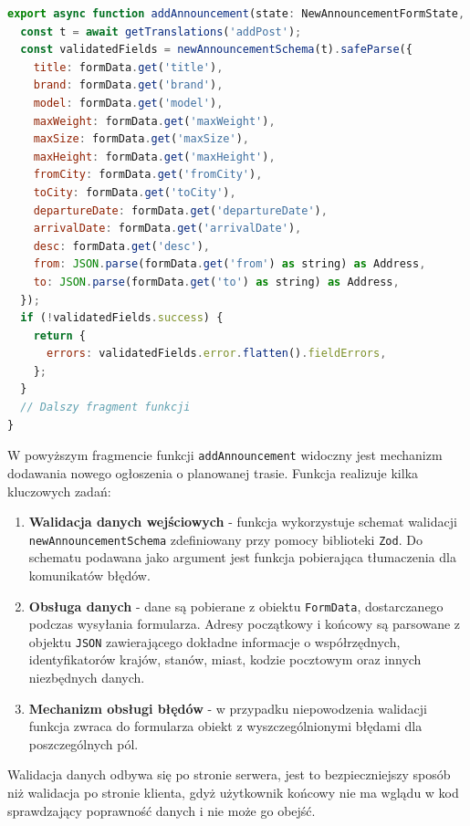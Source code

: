 {\belowcaptionskip=-9pt
\begin{lstlisting}[language=JavaScript,caption=Wstępna walidacja danych przed dodaniem ogłoszenia do bazy danych, label=lst:addAnnouncement]
export async function addAnnouncement(state: NewAnnouncementFormState, formData: FormData) {
  const t = await getTranslations('addPost');
  const validatedFields = newAnnouncementSchema(t).safeParse({
    title: formData.get('title'),
    brand: formData.get('brand'),
    model: formData.get('model'),
    maxWeight: formData.get('maxWeight'),
    maxSize: formData.get('maxSize'),
    maxHeight: formData.get('maxHeight'),
    fromCity: formData.get('fromCity'),
    toCity: formData.get('toCity'),
    departureDate: formData.get('departureDate'),
    arrivalDate: formData.get('arrivalDate'),
    desc: formData.get('desc'),
    from: JSON.parse(formData.get('from') as string) as Address,
    to: JSON.parse(formData.get('to') as string) as Address,
  });
  if (!validatedFields.success) {
    return {
      errors: validatedFields.error.flatten().fieldErrors,
    };
  }
  // Dalszy fragment funkcji
}
\end{lstlisting}
}

W powyższym fragmencie funkcji \texttt{addAnnouncement} widoczny jest mechanizm dodawania nowego ogłoszenia o planowanej trasie. Funkcja realizuje kilka kluczowych zadań:
\begin{enumerate}
    \item \textbf{Walidacja danych wejściowych} - funkcja wykorzystuje schemat walidacji \texttt{newAnnouncementSchema} zdefiniowany przy pomocy biblioteki \texttt{Zod}. Do schematu podawana jako argument jest funkcja pobierająca tłumaczenia dla komunikatów błędów.
    \item \textbf{Obsługa danych} - dane są pobierane z obiektu \texttt{FormData}, dostarczanego podczas wysyłania formularza. Adresy początkowy i końcowy są parsowane z objektu \texttt{JSON} zawierającego dokładne informacje o współrzędnych, identyfikatorów krajów, stanów, miast, kodzie pocztowym oraz innych niezbędnych danych.
    \item \textbf{Mechanizm obsługi błędów} - w przypadku niepowodzenia walidacji funkcja zwraca do formularza obiekt z wyszczególnionymi błędami dla poszczególnych pól.
\end{enumerate}

Walidacja danych odbywa się po stronie serwera, jest to bezpieczniejszy sposób niż walidacja po stronie klienta, gdyż użytkownik końcowy nie ma wglądu w kod sprawdzający poprawność danych i nie może go obejść.


